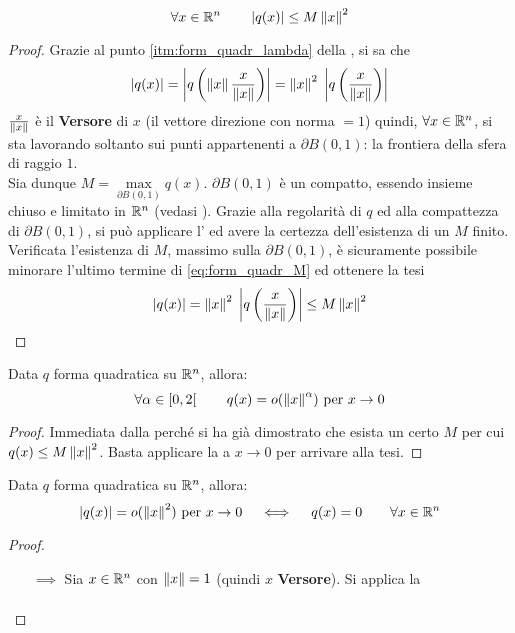 \begin{appendices}
\begin{proposition}
	\[\forall x \in \mathbb{R}^n \qquad \left|q(x)\right| \leq M \left\|x\right\|^2\]
	\begin{proof}
		Grazie al punto \ref{itm:form_quadr_lambda} della , si sa che
		\begin{equation}
			\label{eq:form_quadr_M}
			\left|q(x)\right| = \left|q \left( \left\|x\right\| \frac{x}{\left\|x\right\|} \right)\right| = \left\|x\right\|^2 \; \left|q \left( \frac{x}{\left\|x\right\|} \right)\right|
		\end{equation}
		$\frac{x}{\left\|x\right\|}$ è il \textbf{Versore} di $x$ (il vettore direzione con norma $= 1$) quindi, $\forall x \in \mathbb{R}^n$,
		si sta lavorando soltanto sui punti appartenenti a $\partial B(0,1)$: la frontiera della sfera di raggio $1$.\\
		Sia dunque $M = \max\limits_{\partial B(0,1)} q(x)$. $\partial B(0,1)$ è un compatto, essendo insieme chiuso e limitato
		in $\mathbb{R}^n$ (vedasi ). Grazie alla regolarità di $q$ ed alla compattezza di $\partial B(0,1)$,
		si può applicare l' ed avere la certezza dell'esistenza di un $M$ finito.\\
		Verificata l'esistenza di $M$, massimo sulla $\partial B(0,1)$, è sicuramente possibile minorare l'ultimo termine di \cref{eq:form_quadr_M}
		ed ottenere la tesi
		\[\left|q(x)\right| = \left\|x\right\|^2 \; \left|q \left( \frac{x}{\left\|x\right\|} \right)\right| \leq M \left\|x\right\|^2\]
	\end{proof}
\end{proposition}
\begin{corollary}
	Data $q$ forma quadratica su $\mathbb{R}^n$, allora:
	\[\forall \alpha \in \left[0,2\right[ \qquad q(x) = o(\left\|x\right\|^\alpha) \text{ per } x \to 0\]
	\begin{proof}
		Immediata dalla  perché si ha già dimostrato che esista un certo $M$ per cui $q(x) \leq M \left\|x\right\|^2$.
		Basta applicare la  a $x \to 0$ per arrivare alla tesi.
	\end{proof}
\end{corollary}
\begin{proposition}
	Data $q$ forma quadratica su $\mathbb{R}^n$, allora:
	\[\left|q(x)\right| = o(\left\|x\right\|^2) \text{ per } x \to 0 \quad \iff \quad q(x) = 0 \qquad \forall x \in \mathbb{R}^n\]
	\begin{proof}~
		\begin{itemize}
			\item[$\implies$] Sia $x \in \mathbb{R}^n$ con $\left\|x\right\| = 1$ (quindi $x$ \textbf{Versore}). Si applica la 
				\begin{align*}

\end{align*}
\end{itemize}
\end{proof}
\end{proposition}
\end{appendices}
